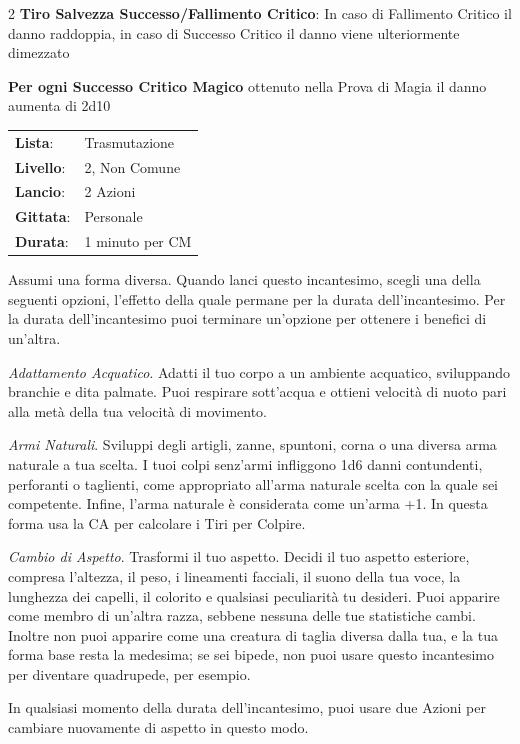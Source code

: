 \begin{multicols}{2}
\textbf{Tiro Salvezza Successo/Fallimento Critico}: In caso di Fallimento Critico il danno raddoppia, in caso di Successo Critico il danno viene ulteriormente dimezzato

\textbf{Per ogni Successo Critico Magico} ottenuto nella Prova di Magia il danno aumenta di 2d10

\noindent\begin{tabularx}{\linewidth}{p{1.9cm}X}
	\rowcolor{gray!20}\textbf{Lista}: & Trasmutazione \\
	\textbf{Livello}: & 2, Non Comune \\
	\rowcolor{gray!20}\textbf{Lancio}: & 2 Azioni \\
	\textbf{Gittata}: & Personale \\
	\rowcolor{gray!20}\textbf{Durata}: & 1 minuto per CM \\
\end{tabularx}\smallskip

\label{Alter Self}Assumi una forma diversa. Quando lanci questo incantesimo, scegli una della seguenti opzioni, l'effetto della quale permane per la durata dell'incantesimo. Per la durata dell'incantesimo puoi terminare un'opzione per ottenere i benefici di un'altra.

\emph{Adattamento Acquatico}. Adatti il tuo corpo a un ambiente acquatico, sviluppando branchie e dita palmate. Puoi respirare sott'acqua e ottieni velocità di nuoto pari alla metà della tua velocità di movimento.

\emph{Armi Naturali}. Sviluppi degli artigli, zanne, spuntoni, corna o una diversa arma naturale a tua scelta. I tuoi colpi senz'armi infliggono 1d6 danni contundenti, perforanti o taglienti, come appropriato all'arma naturale scelta con la quale sei competente. Infine, l'arma naturale è considerata come un'arma +1. In questa forma usa la CA per calcolare i Tiri per Colpire.

\emph{Cambio di Aspetto}. Trasformi il tuo aspetto. Decidi il tuo aspetto esteriore, compresa l'altezza, il peso, i lineamenti facciali, il suono della tua voce, la lunghezza dei capelli, il colorito e qualsiasi peculiarità tu desideri. Puoi apparire come membro di un'altra razza, sebbene nessuna delle tue statistiche cambi. Inoltre non puoi apparire come una creatura di taglia diversa dalla tua, e la tua forma base resta la medesima; se sei bipede, non puoi usare questo incantesimo per diventare quadrupede, per esempio.

In qualsiasi momento della durata dell'incantesimo, puoi usare due Azioni per cambiare nuovamente di aspetto in questo modo.


\end{multicols}
